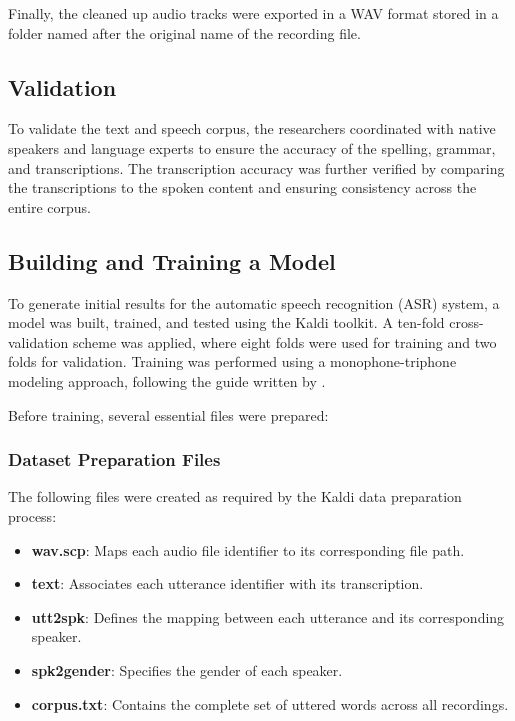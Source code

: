 Finally, the cleaned up audio tracks were exported in a WAV format stored in a folder named after the original name of the recording file.

\subsection{Validation}

To validate the text and speech corpus, the researchers coordinated with native speakers and language experts to ensure the accuracy of the spelling, grammar, and transcriptions. The transcription accuracy was further verified by comparing the transcriptions to the spoken content and ensuring consistency across the entire corpus.

\subsection{Building and Training a Model}

To generate initial results for the automatic speech recognition (ASR) system, a model was built, trained, and tested using the Kaldi toolkit. A ten-fold cross-validation scheme was applied, where eight folds were used for training and two folds for validation. Training was performed using a monophone-triphone modeling approach, following the guide written by .

Before training, several essential files were prepared:

\subsubsection{Dataset Preparation Files}

The following files were created as required by the Kaldi data preparation process:

\begin{itemize}
    \item \textbf{wav.scp}: Maps each audio file identifier to its corresponding file path.
    \item \textbf{text}: Associates each utterance identifier with its transcription.
    \item \textbf{utt2spk}: Defines the mapping between each utterance and its corresponding speaker.
    \item \textbf{spk2gender}: Specifies the gender of each speaker.
    \item \textbf{corpus.txt}: Contains the complete set of uttered words across all recordings.
\end{itemize}

